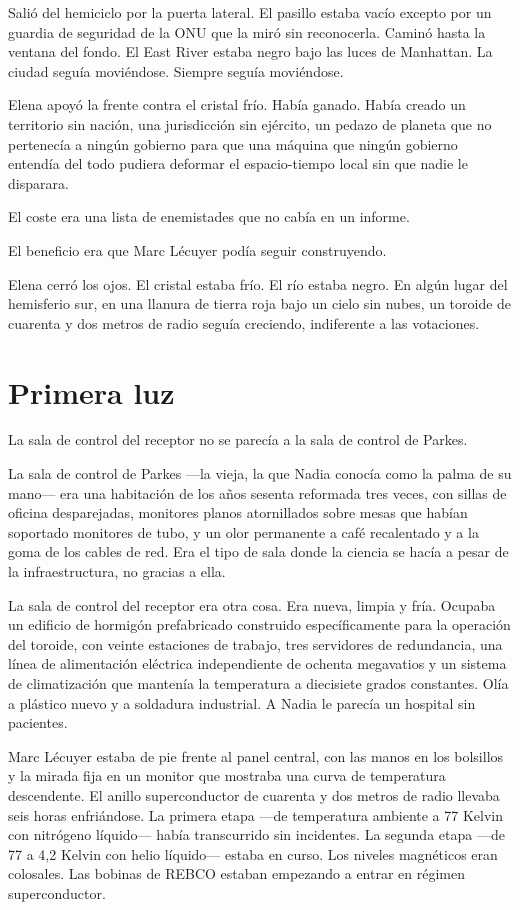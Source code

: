 \documentclass[11pt,a5paper,twoside]{book}
\begin{document}
Salió del hemiciclo por la puerta lateral. El pasillo estaba vacío excepto por un guardia de seguridad de la ONU que la miró sin reconocerla. Caminó hasta la ventana del fondo. El East River estaba negro bajo las luces de Manhattan. La ciudad seguía moviéndose. Siempre seguía moviéndose.

Elena apoyó la frente contra el cristal frío. Había ganado. Había creado un territorio sin nación, una jurisdicción sin ejército, un pedazo de planeta que no pertenecía a ningún gobierno para que una máquina que ningún gobierno entendía del todo pudiera deformar el espacio-tiempo local sin que nadie le disparara.

El coste era una lista de enemistades que no cabía en un informe.

El beneficio era que Marc Lécuyer podía seguir construyendo.

Elena cerró los ojos. El cristal estaba frío. El río estaba negro. En algún lugar del hemisferio sur, en una llanura de tierra roja bajo un cielo sin nubes, un toroide de cuarenta y dos metros de radio seguía creciendo, indiferente a las votaciones.

\chapter{Primera luz}

La sala de control del receptor no se parecía a la sala de control de Parkes.

La sala de control de Parkes —la vieja, la que Nadia conocía como la palma de su mano— era una habitación de los años sesenta reformada tres veces, con sillas de oficina desparejadas, monitores planos atornillados sobre mesas que habían soportado monitores de tubo, y un olor permanente a café recalentado y a la goma de los cables de red. Era el tipo de sala donde la ciencia se hacía a pesar de la infraestructura, no gracias a ella.

La sala de control del receptor era otra cosa. Era nueva, limpia y fría. Ocupaba un edificio de hormigón prefabricado construido específicamente para la operación del toroide, con veinte estaciones de trabajo, tres servidores de redundancia, una línea de alimentación eléctrica independiente de ochenta megavatios y un sistema de climatización que mantenía la temperatura a diecisiete grados constantes. Olía a plástico nuevo y a soldadura industrial. A Nadia le parecía un hospital sin pacientes.

Marc Lécuyer estaba de pie frente al panel central, con las manos en los bolsillos y la mirada fija en un monitor que mostraba una curva de temperatura descendente. El anillo superconductor de cuarenta y dos metros de radio llevaba seis horas enfriándose. La primera etapa —de temperatura ambiente a 77 Kelvin con nitrógeno líquido— había transcurrido sin incidentes. La segunda etapa —de 77 a 4,2 Kelvin con helio líquido— estaba en curso. Los niveles magnéticos eran colosales. Las bobinas de REBCO estaban empezando a entrar en régimen superconductor.
\end{document}
